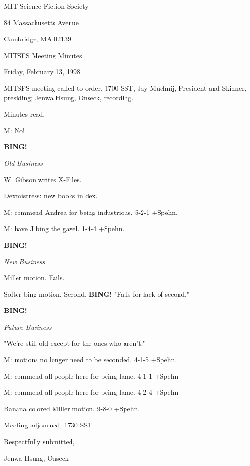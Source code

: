 \documentclass[12pt]{article}
\newcommand{\bing}{{\bf BING!} }
\newcommand{\goto}[1]{\bing \vskip 12pt \centerline{{\em{#1}}}}
\begin{document}
\begin{center}

MIT Science Fiction Society 

84 Massachusetts Avenue

Cambridge, MA 02139

\vspace{12pt}

MITSFS Meeting Minutes 

Friday, February 13, 1998

\end{center}
 
\vspace{18pt}

\setlength{\parskip}{6pt}

\noindent
MITSFS meeting called to order, 1700 SST,
Jay Muchnij, President and Skinner, presiding; Jenwa Hsung, Onseck, recording.

Minutes read.

M: No!

\goto{Old Business}

W. Gibson writes X-Files.

Dexmistress: new books in dex.

M: commend Andrea for being industrious. 5-2-1 +Spehn.

M: have J bing the gavel. 1-4-4 +Spehn.

\goto{New Business}

Miller motion. Fails.

Softer bing motion. Second. \bing "Fails for lack of second."

\goto{Future Business}

"We're still old except for the ones who aren't."

M: motions no longer need to be seconded. 4-1-5 +Spehn.

M: commend all people here for being lame. 4-1-1 +Spehn.

M: commend all people here for being lame. 4-2-4 +Spehn.

Banana colored Miller motion. 9-8-0 +Spehn.

\vspace{12pt}

\noindent
Meeting adjourned, 1730 SST.

\vspace{18pt}

\centerline{Respectfully submitted,}
\centerline{Jenwa Hsung, Onseck}
\end{document}
